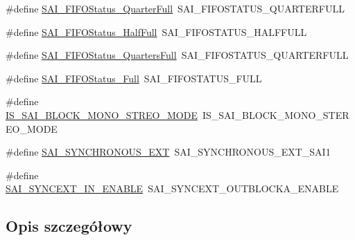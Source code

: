 \begin{DoxyCompactItemize}
\item 
\#define \hyperlink{group___h_a_l___s_a_i___aliased___macros_ga521399b510e0f29fc41fb516a27fe517}{S\+A\+I\+\_\+\+F\+I\+F\+O\+Status\+\_\+Quarter\+Full}~S\+A\+I\+\_\+\+F\+I\+F\+O\+S\+T\+A\+T\+U\+S\+\_\+Q\+U\+A\+R\+T\+E\+R\+F\+U\+LL
\item 
\#define \hyperlink{group___h_a_l___s_a_i___aliased___macros_gafe9200ac26339d1334ab978ae508f352}{S\+A\+I\+\_\+\+F\+I\+F\+O\+Status\+\_\+\+Half\+Full}~S\+A\+I\+\_\+\+F\+I\+F\+O\+S\+T\+A\+T\+U\+S\+\_\+\+H\+A\+L\+F\+F\+U\+LL
\item 
\#define \hyperlink{group___h_a_l___s_a_i___aliased___macros_ga50b6fc16c49a0d4eb2575567f5e9be98}{S\+A\+I\+\_\+\+F\+I\+F\+O\+Status\+\_\+Quarters\+Full}~S\+A\+I\+\_\+\+F\+I\+F\+O\+S\+T\+A\+T\+U\+S\+\_\+Q\+U\+A\+R\+T\+E\+R\+F\+U\+LL
\item 
\#define \hyperlink{group___h_a_l___s_a_i___aliased___macros_ga5e2fd1ac3cea38c8c2fe15cf70efe61a}{S\+A\+I\+\_\+\+F\+I\+F\+O\+Status\+\_\+\+Full}~S\+A\+I\+\_\+\+F\+I\+F\+O\+S\+T\+A\+T\+U\+S\+\_\+\+F\+U\+LL
\item 
\#define \hyperlink{group___h_a_l___s_a_i___aliased___macros_gaa9eb7424d1a759fa3c84ee598b6d53a1}{I\+S\+\_\+\+S\+A\+I\+\_\+\+B\+L\+O\+C\+K\+\_\+\+M\+O\+N\+O\+\_\+\+S\+T\+R\+E\+O\+\_\+\+M\+O\+DE}~I\+S\+\_\+\+S\+A\+I\+\_\+\+B\+L\+O\+C\+K\+\_\+\+M\+O\+N\+O\+\_\+\+S\+T\+E\+R\+E\+O\+\_\+\+M\+O\+DE
\item 
\#define \hyperlink{group___h_a_l___s_a_i___aliased___macros_ga14be5593f2f4de9699b49f5e307e98fe}{S\+A\+I\+\_\+\+S\+Y\+N\+C\+H\+R\+O\+N\+O\+U\+S\+\_\+\+E\+XT}~S\+A\+I\+\_\+\+S\+Y\+N\+C\+H\+R\+O\+N\+O\+U\+S\+\_\+\+E\+X\+T\+\_\+\+S\+A\+I1
\item 
\#define \hyperlink{group___h_a_l___s_a_i___aliased___macros_ga05572ce0b163fe7bd2269692929f84af}{S\+A\+I\+\_\+\+S\+Y\+N\+C\+E\+X\+T\+\_\+\+I\+N\+\_\+\+E\+N\+A\+B\+LE}~S\+A\+I\+\_\+\+S\+Y\+N\+C\+E\+X\+T\+\_\+\+O\+U\+T\+B\+L\+O\+C\+K\+A\+\_\+\+E\+N\+A\+B\+LE
\end{DoxyCompactItemize}


\subsection{Opis szczegółowy}


